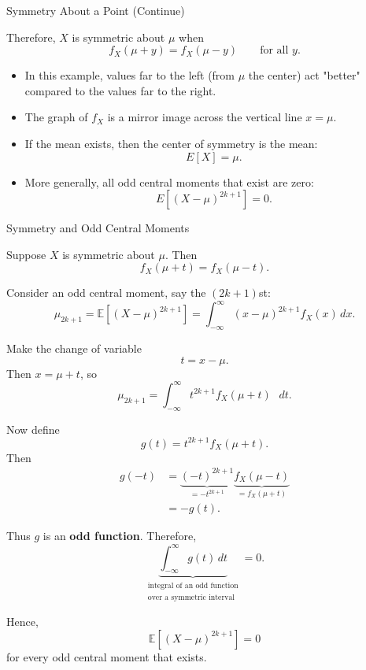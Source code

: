 \begin{frame}{Symmetry About a Point (Continue)}
    
Therefore, $X$ is symmetric about $\mu$ when
\[
f_X(\mu+y)=f_X(\mu-y)
\qquad \text{for all } y.
\]

\begin{itemize}
    \item In this example, values far to the left (from $\mu$ the center) act "better" compared to the values far to the right.
    \item The graph of $f_X$ is a mirror image across the vertical line $x=\mu$.
    \item If the mean exists, then the center of symmetry is the mean:
    \[
    E[X]=\mu.
    \]
    \item More generally, all odd central moments that exist are zero:
    \[
    E\left[(X-\mu)^{2k+1}\right]=0.
    \]
\end{itemize}
\end{frame}



\begin{frame}{Symmetry and Odd Central Moments}
\small

Suppose $X$ is symmetric about $\mu$. Then
\[
f_X(\mu+t)=f_X(\mu-t).
\]

Consider an odd central moment, say the $(2k+1)$st:
\[
\mu_{2k+1}
=
\mathbb{E}\left[(X-\mu)^{2k+1}\right]
=
\int_{-\infty}^{\infty}
(x-\mu)^{2k+1}f_X(x)\,dx.
\]

Make the change of variable
\[
t=x-\mu.
\]
Then $x=\mu+t$, so
\[
\mu_{2k+1}
=
\int_{-\infty}^{\infty}
{t^{2k+1}} 
{f_X(\mu+t)}_{\text{ }}
\,dt.
\]

Now define
\[
g(t)=t^{2k+1}f_X(\mu+t).
\]
Then
\[
\begin{aligned}
g(-t)
&=
\underbrace{(-t)^{2k+1}}_{=-t^{2k+1}}
\underbrace{f_X(\mu-t)}_{=f_X(\mu+t)}\\
&=-g(t).
\end{aligned}
\]

Thus $g$ is an \textbf{odd function}. Therefore,
\[
\underbrace{
\int_{-\infty}^{\infty} g(t)\,dt
}_{\substack{\text{integral of an odd function}\\
\text{over a symmetric interval}}}
=0.
\]

Hence,
\[
\boxed{
\mathbb{E}\left[(X-\mu)^{2k+1}\right]=0
}
\]
for every odd central moment that exists.

\end{frame}






















